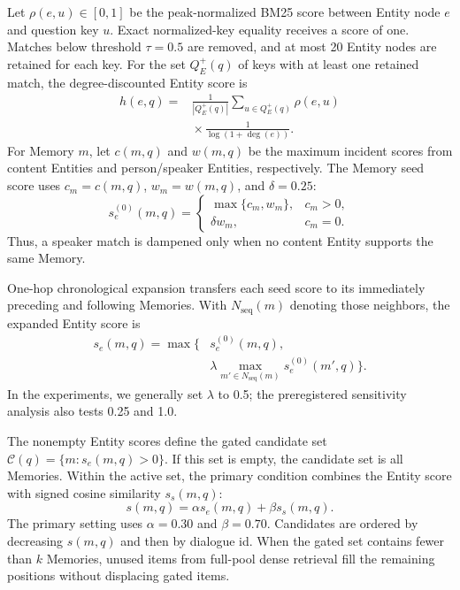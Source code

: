 \documentclass[10pt,twocolumn]{article}
\begin{document}
Let \(\rho(e,u)\in[0,1]\) be the peak-normalized BM25 score between Entity
node \(e\) and question key \(u\). Exact normalized-key equality receives a
score of one. Matches below threshold \(\tau=0.5\) are removed, and at most
20 Entity nodes are retained for each key. For the set \(Q_E^+(q)\) of keys
with at least one retained match, the degree-discounted Entity score is
\begin{equation}
\begin{aligned}
h(e,q)={}&\frac{1}{|Q_E^+(q)|}
\sum_{u\in Q_E^+(q)}\rho(e,u)\\
&{}\times\frac{1}{\log(1+\deg(e))}.
\end{aligned}
\label{eq:entity}
\end{equation}
For Memory \(m\), let \(c(m,q)\) and \(w(m,q)\) be the maximum incident
scores from content Entities and person/speaker Entities, respectively. The
Memory seed score uses \(c_m=c(m,q)\), \(w_m=w(m,q)\), and \(\delta=0.25\):
\begin{equation}
s_e^{(0)}(m,q)=
\begin{cases}
\max\{c_m,w_m\}, & c_m>0,\\
\delta w_m, & c_m=0.
\end{cases}
\label{eq:seed}
\end{equation}
Thus, a speaker match is dampened only when no content Entity supports the
same Memory.

One-hop chronological expansion transfers each seed score to its immediately
preceding and following Memories. With \(N_{\mathrm{seq}}(m)\) denoting those
neighbors, the expanded Entity score is
\begin{equation}
\begin{aligned}
s_e(m,q)=\max\biggl\{&s_e^{(0)}(m,q),\\
&\lambda\max_{m'\in N_{\mathrm{seq}}(m)}s_e^{(0)}(m',q)\biggr\}.
\end{aligned}
\label{eq:sequence}
\end{equation}
In the experiments, we generally set \(\lambda\) to 0.5; the preregistered
sensitivity analysis also tests 0.25 and 1.0.

The nonempty Entity scores define the gated candidate set
\(\mathcal{C}(q)=\{m:s_e(m,q)>0\}\). If this set is empty, the candidate set
is all Memories. Within the active set, the primary condition combines the
Entity score with signed cosine similarity \(s_s(m,q)\):
\begin{equation}
s(m,q)=\alpha s_e(m,q)+\beta s_s(m,q).
\label{eq:fusion}
\end{equation}
The primary setting uses \(\alpha=0.30\) and \(\beta=0.70\).
Candidates are ordered by decreasing \(s(m,q)\) and then by dialogue id. When
the gated set contains fewer than \(k\) Memories, unused items from full-pool
dense retrieval fill the remaining positions without displacing gated items.
\end{document}
